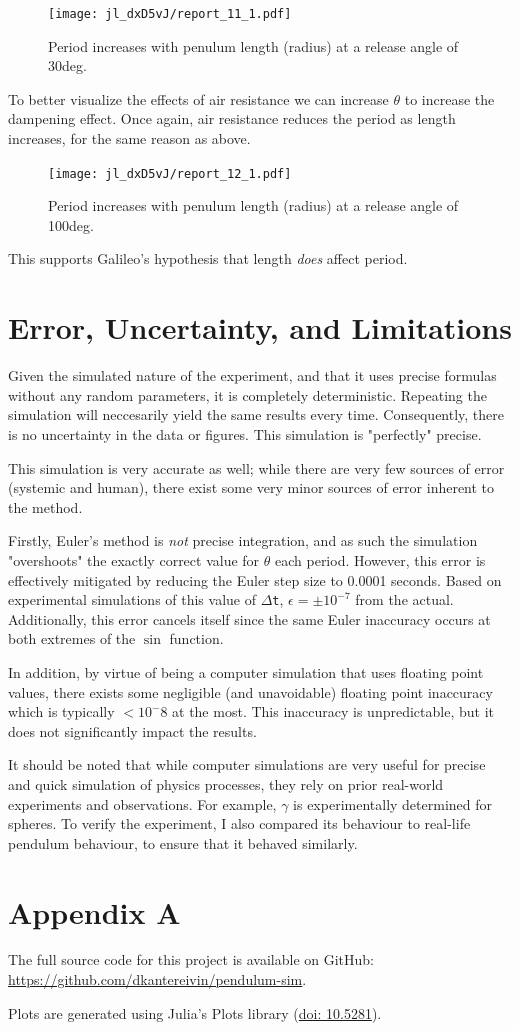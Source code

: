 \documentclass[12pt,a4paper]{article}
\begin{document}
\begin{figure}[!h]
\center
\texttt{[image: jl\_dxD5vJ/report\_11\_1.pdf]}
\caption{Period increases with penulum length (radius) at a release angle of 30deg.}
\end{figure}

To better visualize the effects of air resistance we can increase $\theta$ to increase the dampening effect. Once again, air resistance reduces the period as length increases, for the same reason as above.


\begin{figure}[!h]
\center
\texttt{[image: jl\_dxD5vJ/report\_12\_1.pdf]}
\caption{Period increases with penulum length (radius) at a release angle of 100deg.}
\end{figure}

This supports Galileo's hypothesis that length \emph{does} affect period.

\section{Error, Uncertainty, and Limitations}
Given the simulated nature of the experiment, and that it uses precise formulas without any random parameters, it is completely deterministic. Repeating the simulation will neccesarily yield the same results every time. Consequently, there is no uncertainty in the data or figures. This simulation is "perfectly" precise.

This simulation is very accurate as well; while there are very few sources of error (systemic and human), there exist some very minor sources of error inherent to the method.

Firstly, Euler's method is \emph{not} precise integration, and as such the simulation "overshoots" the exactly correct value for $\theta$ each period. However, this error is effectively mitigated by reducing the Euler step size to 0.0001 seconds. Based on experimental simulations of this value of \texttt{\ensuremath{\Delta}t}, $\epsilon = \pm 10^{-7}$ from the actual. Additionally, this error cancels itself since the same Euler inaccuracy occurs at both extremes of the $\sin$ function.

In addition, by virtue of being a computer simulation that uses floating point values, there exists some negligible (and unavoidable) floating point inaccuracy which is typically $<10^-8$ at the most. This inaccuracy is unpredictable, but it does not significantly impact the results.

It should be noted that while computer simulations are very useful for precise and quick simulation of physics processes, they rely on prior real-world experiments and observations. For example, $\gamma$ is experimentally determined for spheres. To verify the experiment, I also compared its behaviour to real-life pendulum behaviour, to ensure that it behaved similarly.

\section{Appendix A}
The full source code for this project is available on GitHub: \href{https://github.com/dkantereivin/pendulum-sim}{https://github.com/dkantereivin/pendulum-sim}.

Plots are generated using Julia's Plots library (\href{https://doi.org/10.5281/zenodo.4725317}{doi: 10.5281}).
\end{document}
